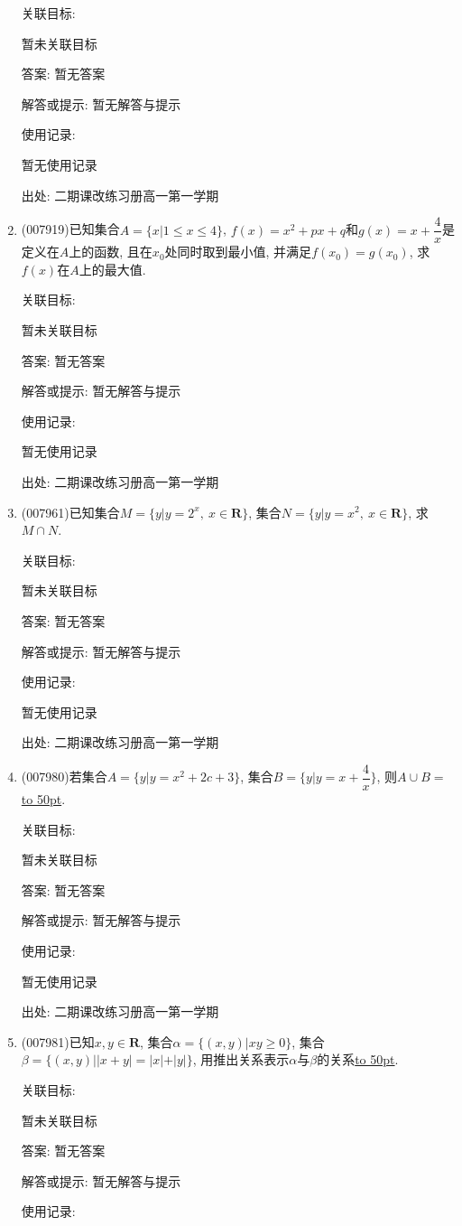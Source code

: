 \documentclass[10pt,a4paper]{article}
\newcommand{\blank}[1]{\underline{\hbox to #1pt{}}}
\begin{document}
\begin{enumerate}[1.]
关联目标:

暂未关联目标

答案: 暂无答案

解答或提示: 暂无解答与提示

使用记录:

暂无使用记录


出处: 二期课改练习册高一第一学期
\item { (007919)}已知集合$A=\{x|1\le x\le 4\}$, $f(x)=x^2+px+q$和$g(x)=x+\dfrac 4x$是定义在$A$上的函数, 且在$x_0$处同时取到最小值, 并满足$f(x_0)=g(x_0)$, 求$f(x)$在$A$上的最大值.


关联目标:

暂未关联目标

答案: 暂无答案

解答或提示: 暂无解答与提示

使用记录:

暂无使用记录


出处: 二期课改练习册高一第一学期
\item { (007961)}已知集合$M=\{y|y=2^x,\ x\in \mathbf{R}\}$, 集合$N=\{y|y=x^2,\ x\in \mathbf{R}\}$, 求$M\cap N$.


关联目标:

暂未关联目标

答案: 暂无答案

解答或提示: 暂无解答与提示

使用记录:

暂无使用记录


出处: 二期课改练习册高一第一学期
\item { (007980)}若集合$A=\{y|y=x^2+2c+3\}$, 集合$B=\{y|y=x+\dfrac 4x\}$, 则$A\cup B=$\blank{50}.


关联目标:

暂未关联目标

答案: 暂无答案

解答或提示: 暂无解答与提示

使用记录:

暂无使用记录


出处: 二期课改练习册高一第一学期
\item { (007981)}已知$x,y\in \mathbf{R}$, 集合$\alpha =\{(x,y)|xy\ge 0\}$, 集合$\beta =\{(x,y)||x+y|=|x|+|y|\}$, 用推出关系表示$\alpha$与$\beta$的关系\blank{50}.


关联目标:

暂未关联目标

答案: 暂无答案

解答或提示: 暂无解答与提示

使用记录:


\end{enumerate}
\end{document}
